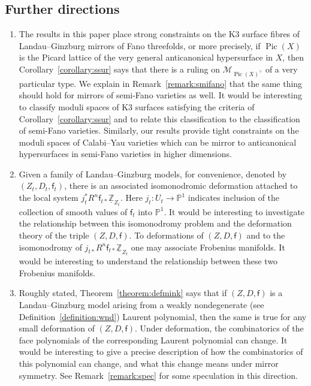 \documentclass[10pt]{amsart}
\numberwithin{equation}{section}
\theoremstyle{plain}
\theoremstyle{definition}
\theoremstyle{remark}
\DeclareMathOperator{\Pic}{Pic}
\begin{document}
\subsection{Further directions}

\begin{enumerate}[(1)]
\item The results in this paper place strong constraints on the K3 surface fibres of Landau--Ginzburg mirrors of Fano threefolds, or more precisely, if \(\Pic(X)\) is the Picard lattice of the very general anticanonical hypersurface in \(X\), then Corollary~\ref{corollary:ssur} says that there is a ruling on \(\mathcal{M}_{\Pic(X)^\vee}\) of a very particular type. We explain in Remark~\ref{remark:smifano} that the same thing should hold for mirrors of semi-Fano varieties as well. It would be interesting to classify moduli spaces of K3 surfaces satisfying the criteria of Corollary~\ref{corollary:ssur} and to relate this classification to the classification of semi-Fano varieties. Similarly, our results provide tight constraints on the moduli spaces of Calabi--Yau varieties which can be mirror to anticanonical hypersurfaces in semi-Fano varieties in higher dimensions.

\item Given a family of Landau--Ginzburg models, for convenience, denoted by \((Z_t,D_t,\mathsf{f}_t)\), there is an associated isomonodromic deformation attached to the local system \(j_t^*R^n\mathsf{f}_{t*}\underline{\mathbb{Z}}_{Z_t}\). Here \(j_t :U_t\rightarrow \mathbb{P}^1\) indicates inclusion of the collection of smooth values of \(\mathsf{f}_t\) into \(\mathbb{P}^1\). It would be interesting to investigate the relationship between this isomonodromy problem and the deformation theory of the triple \((Z,D,\mathsf{f})\). To deformations of \((Z,D,\mathsf{f})\) and to the isomonodromy of \(j_{t*}R^n\mathsf{f}_{t*}\underline{\mathbb{Z}}_{Z_t}\) one may associate Frobenius manifolds. It would be interesting to understand the relationship between these two Frobenius manifolds.

\item Roughly stated, Theorem~\ref{theorem:defmink} says that if \((Z,D,\mathsf{f})\) is a Landau--Ginzburg model arising from a weakly nondegenerate (see Definition~\ref{definition:wnd}) Laurent polynomial, then the same is true for any small deformation of \((Z,D,\mathsf{f})\). Under deformation, the combinatorics of the face polynomials of the corresponding Laurent polynomial can change. It would be interesting to give a precise description of how the combinatorics of this polynomial can change, and what this change means under mirror symmetry. See Remark~\ref{remark:spec} for some speculation in this direction.


\end{enumerate}
\end{document}
